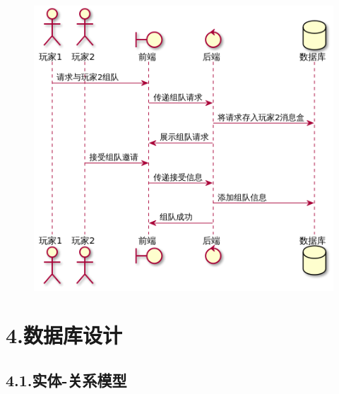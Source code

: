 \documentclass{article}
\begin{document}
\begin{figure}[tbp]%
\begin{mdcenter}%

\noindent{}\includegraphics[keepaspectratio=true,width=\dimwidth{0.75}]{./img/8}{}%

\mdhr{}%

\noindent{}%
\end{mdcenter}%
\end{figure}%

\section{4.\hspace*{0.5em}数据库设计}\label{4}%

\subsection{4.1.\hspace*{0.5em}实体-关系模型}\label{41}%
\end{document}
